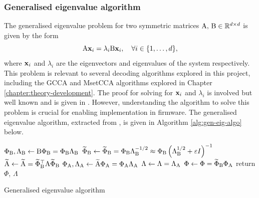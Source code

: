 \subsubsection{Generalised eigenvalue algorithm}
The generalised eigenvalue problem for two symmetric matrices ${\textrm{A}}, \, {\textrm{B}} \in \mathbb{R}^{d \times d}$ is given by the form
\begin{equation}
    {\textrm{A}}{\mathbf{x}}_{i}=\lambda_{i} {\textrm{B}} {\mathbf{x}}_{i}, \quad \forall i \in\{1, \ldots, d\},
    \label{eq:gen-eig-problem}
\end{equation}
where ${\mathbf{x}}_i$ and $\lambda_i$ are the eigenvectors and eigenvalues of the system respectively. This problem is relevant to several decoding algorithms explored in this project, including the GCCA and MsetCCA algorithms explored in Chapter \ref{chapter:theory-development}. The proof for solving for ${\mathbf{x}}_i$ and $\lambda_i$ is involved but well known and is given in \cite{ghojogh-gen-eig-prob}. However, understanding the algorithm to solve this problem is crucial for enabling implementation in firmware. The generalised eigenvalue algorithm, extracted from \cite{ghojogh-gen-eig-prob}, is given in Algorithm \ref{alg:gen-eig-algo} below.

\begin{algorithm}
\begin{algorithmic}
\State $\Phi_{{\textrm{B}}}, \Lambda_{{\textrm{B}}} \gets {\textrm{B}} \Phi_{{\textrm{B}}}=\Phi_{{\textrm{B}}} \Lambda_{{\textrm{B}}}$ 
\State $\widetilde{\Phi}_{{\textrm{B}}} \gets \widetilde{\Phi}_{{\textrm{B}}}=\Phi_{{\textrm{B}}} \Lambda_{{\textrm{B}}}^{-1 / 2} \approx \Phi_{{\textrm{B}}}\left(\Lambda_{{\textrm{B}}}^{1 / 2}+\varepsilon I\right)^{-1}$ 
\State $\widetilde{{\textrm{A}}} \gets \widetilde{{\textrm{A}}}=\widetilde{\Phi}_{{\textrm{B}}}^{\top} {\textrm{A}} \widetilde{\Phi}_{{\textrm{B}}}$ 
\State $\Phi_{{\textrm{A}}}, \Lambda_{{\textrm{A}}} \gets \widetilde{{\textrm{A}}} \Phi_{{\textrm{A}}}=\Phi_{{\textrm{A}}} \Lambda_{{\textrm{A}}}$ 
\State $\Lambda \gets \Lambda=\Lambda_{{\textrm{A}}}$ 
\State $\Phi \gets \Phi=\widetilde{\Phi}_{{\textrm{B}}} \Phi_{{\textrm{A}}}$ 
\State return $\Phi$, $\Lambda$ 
\end{algorithmic}
\caption{Generalised eigenvalue algorithm}
\label{alg:gen-eig-algo}
\end{algorithm}

